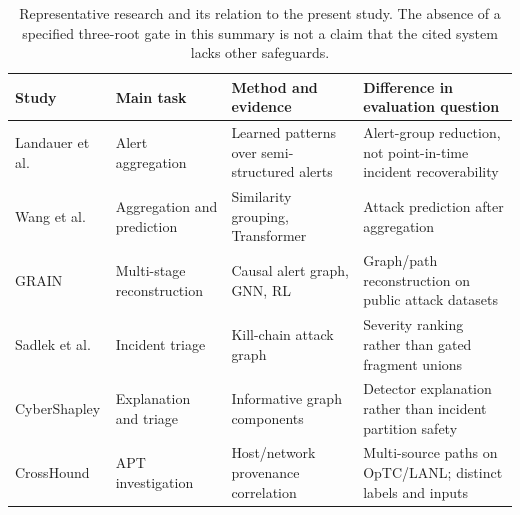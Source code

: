 \begin{table}[t]\centering\footnotesize\caption{Representative research and its relation to the present study. The absence of a specified three-root gate in this summary is not a claim that the cited system lacks other safeguards.}\label{tab:prior}
\begin{tabularx}{\textwidth}{@{}p{}p{}Y Y@{}}\toprule
Study & Main task & Method and evidence & Difference in evaluation question\\\midrule
Landauer et al. \cite{landauer2022} & Alert aggregation & Learned patterns over semi-structured alerts & Alert-group reduction, not point-in-time incident recoverability\\
Wang et al. \cite{wang2024} & Aggregation and prediction & Similarity grouping, Transformer & Attack prediction after aggregation\\
GRAIN \cite{grain2025} & Multi-stage reconstruction & Causal alert graph, GNN, RL & Graph/path reconstruction on public attack datasets\\
Sadlek et al. \cite{sadlek2025} & Incident triage & Kill-chain attack graph & Severity ranking rather than gated fragment unions\\
CyberShapley \cite{malach2025} & Explanation and triage & Informative graph components & Detector explanation rather than incident partition safety\\
CrossHound \cite{crosshound2026} & APT investigation & Host/network provenance correlation & Multi-source paths on OpTC/LANL; distinct labels and inputs\\\bottomrule
\end{tabularx}\end{table}
